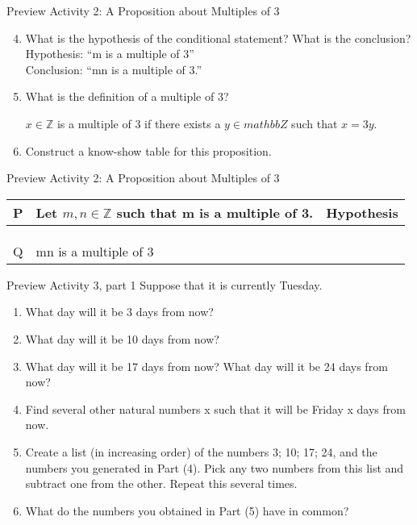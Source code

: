 \documentclass{beamer}
\begin{document}
\begin{frame}{Preview Activity 2: A Proposition about Multiples of 3}
	\begin{enumerate}
		\setcounter{enumi}{3}
		\item What is the hypothesis of the conditional statement?  What is the conclusion?\\[.1 in] \pause
		Hypothesis: ``m is a multiple of 3''\\Conclusion: ``mn is a multiple of 3.''
		\item What is the definition of a multiple of 3? \pause
		\begin{center}
			$x \in \mathbb{Z}$ is a multiple of 3 if there exists a $y \in mathbb{Z}$ such that $x = 3y$.
		\end{center}
		\pause
		\item Construct a know-show table for this proposition.
	\end{enumerate}
\end{frame}

\begin{frame}{Preview Activity 2: A Proposition about Multiples of 3}
	\begin{tabular}{|l|p{2.5 in}|p{1 in}|}
		\hline
		P & Let $m, n \in \mathbb{Z}$ such that m is a multiple of 3. & Hypothesis\\ \hline
		& & \\ \hline
		& & \\ \hline
		& & \\ \hline
		Q & mn is a multiple of 3 & \\ \hline
	\end{tabular}
\end{frame}

\begin{frame}{Preview Activity 3, part 1}
	Suppose that it is currently Tuesday.
	\begin{enumerate}
		\item What day will it be 3 days from now?\pause
		\item What day will it be 10 days from now?\pause
		\item What day will it be 17 days from now? What day will it be 24 days
		from now? \pause
		\item Find several other natural numbers x such that it will be Friday x days
		from now.
		\item Create a list (in increasing order) of the numbers 3; 10; 17; 24, and the
		numbers you generated in Part (4). Pick any two numbers from this
		list and subtract one from the other. Repeat this several times. \pause
		\item What do the numbers you obtained in Part (5) have in common?
	\end{enumerate}
\end{frame}
\end{document}
